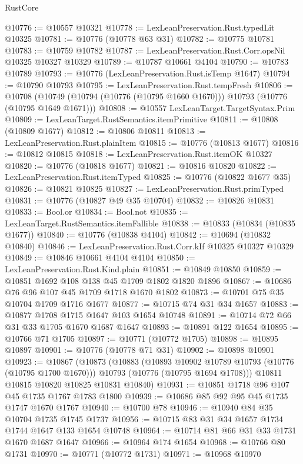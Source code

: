 \begin{lexlean}{RustCore}
\begin{coremodule}
@10776 := @10557 @10321
@10778 := LexLeanPreservation.Rust.typedLit @10325
@10781 := @10776 (@10778 @63 @31)
@10782 := @10775 @10781
@10783 := @10759 @10782
@10787 := LexLeanPreservation.Rust.Corr.opsNil @10325 @10327 @10329
@10789 := @10787 @10661 @4104
@10790 := @10783 @10789
@10793 := @10776 (LexLeanPreservation.Rust.isTemp @1647)
@10794 := @10790 @10793
@10795 := LexLeanPreservation.Rust.tempFresh
@10806 := @10708
    (@10749 (@10794 (@10776 (@10795 @1660 @1670))) @10793 (@10776 (@10795 @1649 @1671)))
@10808 := @10557 LexLeanTarget.TargetSyntax.Prim
@10809 := LexLeanTarget.RustSemantics.itemPrimitive
@10811 := @10808 (@10809 @1677)
@10812 := @10806 @10811
@10813 := LexLeanPreservation.Rust.plainItem
@10815 := @10776 (@10813 @1677)
@10816 := @10812 @10815
@10818 := LexLeanPreservation.Rust.itemOK @10327
@10820 := @10776 (@10818 @1677)
@10821 := @10816 @10820
@10822 := LexLeanPreservation.Rust.itemTyped
@10825 := @10776 (@10822 @1677 @35)
@10826 := @10821 @10825
@10827 := LexLeanPreservation.Rust.primTyped
@10831 := @10776 (@10827 @49 @35 @10704)
@10832 := @10826 @10831
@10833 := Bool.or
@10834 := Bool.not
@10835 := LexLeanTarget.RustSemantics.itemFallible
@10838 := @10833 (@10834 (@10835 @1677))
@10840 := @10776 (@10838 @4104)
@10842 := @10694 (@10832 @10840)
@10846 := LexLeanPreservation.Rust.Corr.kIf @10325 @10327 @10329
@10849 := @10846 @10661 @4104 @4104
@10850 := LexLeanPreservation.Rust.Kind.plain
@10851 := @10849 @10850
@10859 := @10851 @1692 @108 @138 @45 @1709 @1802 @1820 @1896
@10867 := @10686 @76 @96 @107 @45 @1709 @1718 @1670 @1802
@10873 := @10701 @75 @35 @10704 @1709 @1716 @1677
@10877 := @10715 @74 @31 @34 @1657
@10883 := @10877 @1708 @1715 @1647 @103 @1654 @10748
@10891 := @10714 @72 @66 @31 @33 @1705 @1670 @1687 @1647
@10893 := @10891 @122 @1654
@10895 := @10766 @71 @1705
@10897 := @10771 (@10772 @1705)
@10898 := @10895 @10897
@10901 := @10776 (@10778 @71 @31)
@10902 := @10898 @10901
@10923 := @10867
    (@10873
      (@10883
        (@10893 @10902 @10789 @10793 (@10776 (@10795 @1700 @1670)))
        @10793
        (@10776 (@10795 @1694 @1708)))
      @10811
      @10815
      @10820
      @10825
      @10831
      @10840)
@10931 := @10851 @1718 @96 @107 @45 @1735 @1767 @1783 @1800
@10939 := @10686 @85 @92 @95 @45 @1735 @1747 @1670 @1767
@10940 := @10700 @78
@10946 := @10940 @84 @35 @10704 @1735 @1745 @1737
@10956 := @10715 @83 @31 @34 @1657 @1734 @1744 @1647 @133 @1654 @10748
@10964 := @10714 @81 @66 @31 @33 @1731 @1670 @1687 @1647
@10966 := @10964 @174 @1654
@10968 := @10766 @80 @1731
@10970 := @10771 (@10772 @1731)
@10971 := @10968 @10970

\end{coremodule}
\end{lexlean}
